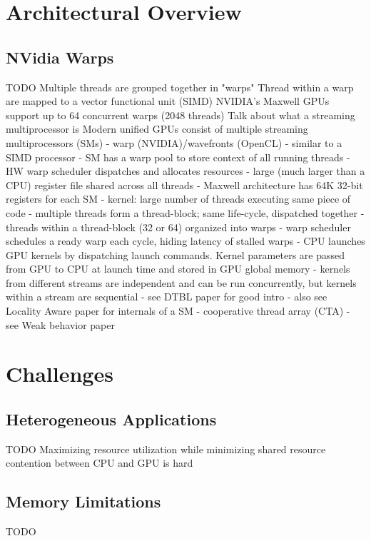 \documentclass[prodmode,acmtecs]{acmsmall} %
\begin{document}
\section{Architectural Overview} \label{sec:architecture}
\subsection{NVidia Warps}
TODO
Multiple threads are grouped together in "warps"
Thread within a warp are mapped to a vector functional unit (SIMD)
NVIDIA's Maxwell GPUs support up to 64 concurrent warps (2048 threads)
Talk about what a streaming multiprocessor is
Modern unified GPUs consist of multiple streaming multiprocessors (SMs)
  - warp (NVIDIA)/wavefronts (OpenCL)
  - similar to a SIMD processor
  - SM has a warp pool to store context of all running threads
  - HW warp scheduler dispatches and allocates resources
  - large (much larger than a CPU) register file shared across all threads
    - Maxwell architecture has 64K 32-bit registers for each SM
  - kernel: large number of threads executing same piece of code
  - multiple threads form a thread-block; same life-cycle, dispatched together
  - threads within a thread-block (32 or 64) organized into warps
  - warp scheduler schedules a ready warp each cycle, hiding latency of stalled warps
  - CPU launches GPU kernels by dispatching launch commands. Kernel parameters are passed from GPU to CPU at launch time and stored in GPU global memory
  - kernels from different streams are independent and can be run concurrently, but kernels within a stream are sequential
  - see DTBL paper for good intro
  - also see Locality Aware paper for internals of a SM
  - cooperative thread array (CTA) - see Weak behavior paper

\section{Challenges} \label{sec:challenges}
\subsection{Heterogeneous Applications}
TODO
Maximizing resource utilization while minimizing shared resource contention between CPU and GPU is hard
\subsection{Memory Limitations}
TODO
\end{document}
